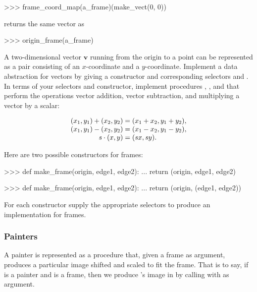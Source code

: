 \begin{codeBlock}
>>> frame_coord_map(a_frame)(make_vect(0, 0))
\end{codeBlock}

\noindent
returns the same vector as

\begin{codeBlock}
>>> origin_frame(a_frame)
\end{codeBlock}

\begin{exerciseGroup}
\label{Exercise 2.46}
 A two-dimensional vector \( \mathbf{v} \)
running from the origin to a point can be represented as a pair consisting of
an \( x \)-coordinate and a \( y \)-coordinate.  Implement a data abstraction
for vectors by giving a constructor  and corresponding
selectors  and .  In terms of your selectors
and constructor, implement procedures , , and
 that perform the operations vector addition, vector
subtraction, and multiplying a vector by a scalar:

$$
\begin{array}{r@{{}={}}l}
	(x_1, y_1) + (x_2, y_2) 	& (x_1 + x_2, y_1 + y_2), \\
	(x_1, y_1) - (x_2, y_2) 	& (x_1 - x_2, y_1 - y_2), \\
	s \cdot (x, y) 			& (sx, sy).
\end{array}
$$


\label{Exercise 2.47}
 Here are two possible
constructors for frames:

\begin{codeBlock}
>>> def make_frame(origin, edge1, edge2):
...     return (origin, edge1, edge2)

>>> def make_frame(origin, edge1, edge2):
...     return (origin, (edge1, edge2))
\end{codeBlock}

For each constructor supply the appropriate selectors to produce an
implementation for frames.
\end{exerciseGroup}

\subsubsection*{Painters}

A painter is represented as a procedure that, given a frame as argument,
produces a particular image shifted and scaled to fit the frame.  That is to
say, if  is a painter and  is a frame, then we produce
's image in  by calling  with  as argument.


